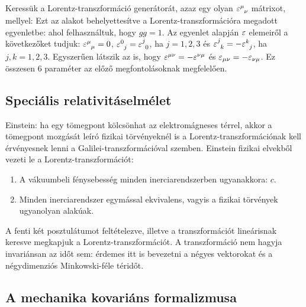     Keressük a Lorentz-transzformáció generátorát, azaz egy olyan $\varepsilon^\mu_{\phantom{\mu}\nu}$ mátrixot, mellyel:
    Ezt az alakot behelyettesítve a Lorentz-transzformációra megadott egyenletbe:
    ahol felhasználtuk, hogy $gg=1$. Az egyenlet alapján $\varepsilon$ elemeiről a következőket tudjuk: $\varepsilon^\mu_{\phantom{\mu}\mu}=0$, $\varepsilon^0_{\phantom{0}j}=\varepsilon^j_{\phantom{j}0}$, ha $j=1,2,3$ és $\varepsilon^j_{\phantom{j}k}=-\varepsilon^k_{\phantom{k}j}$, ha $j,k=1,2,3$. Egyszerűen látszik az is, hogy $\varepsilon^{\mu\nu}=-\varepsilon^{\nu\mu}$ és $\varepsilon_{\mu\nu}=-\varepsilon_{\nu\mu}$. Ez összesen 6 paraméter az előző megfontolásoknak megfelelően.
    
   
   
  \subsection{Speciális relativitáselmélet}
   
   Einstein: ha egy tömegpont kölcsönhat az elektromágneses térrel, akkor a tömegpont mozgását leíró fizikai törvényeknél is a Lorentz-transzformációnak kell érvényesnek lenni a Galilei-transzformációval szemben. Einstein fizikai elvekből vezeti le a Lorentz-transzformációt:
   \begin{enumerate}
    \item A vákuumbeli fénysebesség minden inerciarendszerben ugyanakkora: $c$.
    \item Minden inerciarendszer egymással ekvivalens, vagyis a fizikai törvények ugyanolyan alakúak.
   \end{enumerate}
   
   A fenti két posztulátumot feltételezve, illetve a transzformációt lineárisnak keresve megkapjuk a Lorentz-transzformációt. A transzformáció nem hagyja invariánsan az időt sem: érdemes itt is bevezetni a négyes vektorokat és a négydimenziós Minkowski-féle téridőt.
   
  \subsection{A mechanika kovariáns formalizmusa}
   
